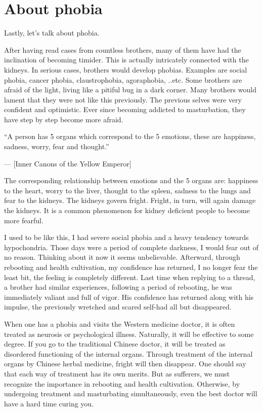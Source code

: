 \documentclass[
]{book}
\begin{document}
\hypertarget{about-phobia}{%
\section{About phobia}\label{about-phobia}}

Lastly, let's talk about phobia.

After having read cases from countless brothers, many of them have had the inclination of becoming timider. This is actually intricately connected with the kidneys. In serious cases, brothers would develop phobias. Examples are social phobia, cancer phobia, claustrophobia, agoraphobia, ..etc. Some brothers are afraid of the light, living like a pitiful bug in a dark corner. Many brothers would lament that they were not like this previously. The previous selves were very confident and optimistic. Ever since becoming addicted to masturbation, they have step by step become more afraid.

``A person has 5 organs which correspond to the 5 emotions, these are happiness, sadness, worry, fear and thought.''

--- {[}Inner Canons of the Yellow Emperor{]}

The corresponding relationship between emotions and the 5 organs are: happiness to the heart, worry to the liver, thought to the spleen, sadness to the lungs and fear to the kidneys. The kidneys govern fright. Fright, in turn, will again damage the kidneys. It is a common phenomenon for kidney deficient people to become more fearful.

I used to be like this, I had severe social phobia and a heavy tendency towards hypochondria. Those days were a period of complete darkness, I would fear out of no reason. Thinking about it now it seems unbelievable. Afterward, through rebooting and health cultivation, my confidence has returned, I no longer fear the least bit, the feeling is completely different. Last time when replying to a thread, a brother had similar experiences, following a period of rebooting, he was immediately valiant and full of vigor. His confidence has returned along with his impulse, the previously wretched and scared self-had all but disappeared.

When one has a phobia and visits the Western medicine doctor, it is often treated as neurosis or psychological illness. Naturally, it will be effective to some degree. If you go to the traditional Chinese doctor, it will be treated as disordered functioning of the internal organs. Through treatment of the internal organs by Chinese herbal medicine, fright will then disappear. One should say that each way of treatment has its own merits. But as sufferers, we must recognize the importance in rebooting and health cultivation. Otherwise, by undergoing treatment and masturbating simultaneously, even the best doctor will have a hard time curing you.
\end{document}
